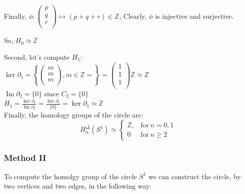 \documentclass[11pt,a4paper]{report}
\DeclareMathOperator{\Ima}{Im}
\begin{document}
           Finally, $ \phi: \overline{\left(\begin{array}{c}
                    p\\
                    q\\
                    r\\
            \end{array} \right)} \mapsto (p+q+r) \in \mathbb{Z} $, Clearly, $\phi$ is injective and surjective.

          So, $H_0 \simeq \mathbb{Z} $ \\

\par
Second, let's compute $H_1$: \\
$\ker\partial_1 = \left\{ \left(\begin{array}{c}
                    m\\
                    m\\
                    m\\
            \end{array} \right), m \in \mathbb{Z} = \right\} = \left(\begin{array}{c}
                    1\\
                    1\\
                    1\\
            \end{array} \right) \mathbb{Z} \simeq \mathbb{Z}$ \\
$\Ima\partial_2 = \{0\}$ since $C_2 = \{0\}$ \\
$H_1 = \frac{\ker\partial_1}{\Ima\partial_2} =
		\frac{ \ker{\partial_1} }{ \{0\} } = \ker{\partial_1} \simeq \mathbb{Z}$ \\


Finally, the homology groups of the circle are:
		\[
	  		H_n^\Delta(S^1) \simeq \left\{
			      \begin{array}{rl}
			     \mathbb{Z}, & \textrm{for} \: n = 0, 1\\

                        0 & \textrm{for} \: n \geqslant 2
			      \end{array}
			 \right.
	  	\]

 \subsubsection{Method II}
                  To compute the homolgy group of the circle $S^1$ we can construct the circle, by two vertices and two edges, in the following way: \\
\end{document}
